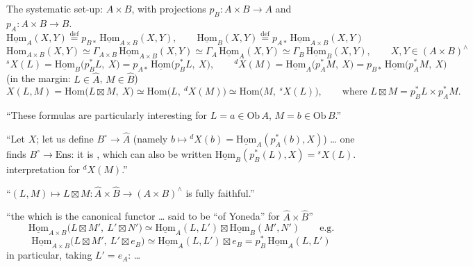 \documentclass[11pt,a4paper]{article}
\begin{document}
The systematic set-up: $A \times B$, with projections
$p_{B} : A\times B \to A$ and $p_{A} : A\times B \to B$.
\[
\underline{\mathrm{Hom}}_{A}(X,Y) \overset{\mathrm{def}}{=}
   p_{B*}\,\underline{\mathrm{Hom}}_{A\times B}(X,Y),
\qquad
\underline{\mathrm{Hom}}_{B}(X,Y) \overset{\mathrm{def}}{=}
   p_{A*}\,\underline{\mathrm{Hom}}_{A\times B}(X,Y)
\]
\[
\mathrm{Hom}_{A\times B}(X,Y)
\simeq \Gamma_{A\times B}\,\underline{\mathrm{Hom}}_{A\times B}(X,Y)
\simeq \Gamma_{A}\,\underline{\mathrm{Hom}}_{A}(X,Y)
\simeq \Gamma_{B}\,\underline{\mathrm{Hom}}_{B}(X,Y),
\qquad X, Y \in (A\times B)^{\wedge}
\]
\[
{}^{s}X(L) = \underline{\mathrm{Hom}}_{B}\bigl(p_{B}^{*}L,\ X\bigr)
           = p_{A*}\,\underline{\mathrm{Hom}}\bigl(p_{B}^{*}L,\ X\bigr),
\qquad
{}^{d}X(M) = \underline{\mathrm{Hom}}_{A}\bigl(p_{A}^{*}M,\ X\bigr)
           = p_{B*}\,\underline{\mathrm{Hom}}\bigl(p_{A}^{*}M,\ X\bigr)
\]
(in the margin: $L \in \widehat{A}$, $M \in \widehat{B}$)
\[
X(L,M) = \mathrm{Hom}\bigl(L \boxtimes M,\ X\bigr)
\simeq \mathrm{Hom}\bigl(L,\ {}^{d}X(M)\bigr)
\simeq \mathrm{Hom}\bigl(M,\ {}^{s}X(L)\bigr),
\qquad\text{where } L \boxtimes M = p_{B}^{*}L \times p_{A}^{*}M .
\]

``These formulas are particularly interesting for
$L = a \in \mathrm{Ob}\,A$, $M = b \in \mathrm{Ob}\,B$.''

``Let $X$; let us define $B^{\circ} \to \widehat{A}$ (namely
$b \mapsto {}^{d}X(b) = \underline{\mathrm{Hom}}_{A}(p_{A}^{*}(b), X)$)
\ldots{} one finds $B^{\circ} \to \mathrm{Ens}$: it is \ill{}, which can
also be written $\underline{\mathrm{Hom}}_{B}(p_{B}^{*}(L), X) = {}^{s}X(L)$.
 interpretation for ${}^{d}X(M)$.''

``$(L,M) \mapsto L \boxtimes M : \widehat{A} \times \widehat{B} \to
(A\times B)^{\wedge}$ is fully faithful.''

``the \ill{} which is the canonical functor \ldots{} said to be ``of
Yoneda'' for $\widehat{A} \times \widehat{B}$''
\[
\underline{\mathrm{Hom}}_{A\times B}\bigl(L\boxtimes M',\ L'\boxtimes N'\bigr)
\simeq \underline{\mathrm{Hom}}_{A}(L,L') \boxtimes
       \underline{\mathrm{Hom}}_{B}(M',N')
\qquad \text{e.g.}
\]
\[
\underline{\mathrm{Hom}}_{A\times B}\bigl(L\boxtimes M',\ L'\boxtimes e_{B}\bigr)
\simeq \underline{\mathrm{Hom}}_{A}(L,L') \boxtimes e_{B}
= p_{B}^{*}\,\underline{\mathrm{Hom}}_{A}(L,L')
\]
in particular, taking $L' = e_{A}$: \ldots
{}
\end{document}
